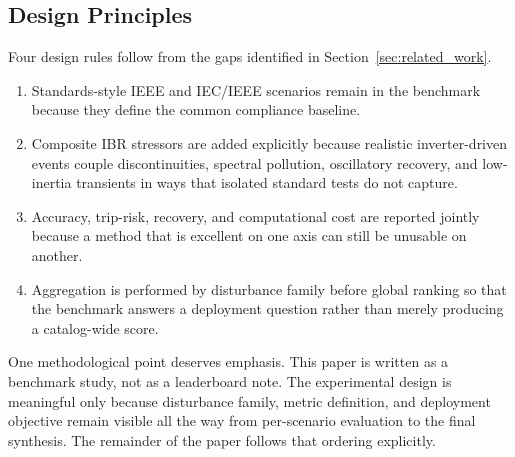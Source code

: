 \subsection{Design Principles}

Four design rules follow from the gaps identified in Section~\ref{sec:related_work}.
\begin{enumerate}[leftmargin=1.8em]
\item Standards-style IEEE and IEC/IEEE scenarios remain in the benchmark because they define the common compliance baseline.
\item Composite IBR stressors are added explicitly because realistic inverter-driven events couple discontinuities, spectral pollution, oscillatory recovery, and low-inertia transients in ways that isolated standard tests do not capture.
\item Accuracy, trip-risk, recovery, and computational cost are reported jointly because a method that is excellent on one axis can still be unusable on another.
\item Aggregation is performed by disturbance family before global ranking so that the benchmark answers a deployment question rather than merely producing a catalog-wide score.
\end{enumerate}

One methodological point deserves emphasis. This paper is written as a benchmark study, not as a leaderboard note. The experimental design is meaningful only because disturbance family, metric definition, and deployment objective remain visible all the way from per-scenario evaluation to the final synthesis. The remainder of the paper follows that ordering explicitly.
